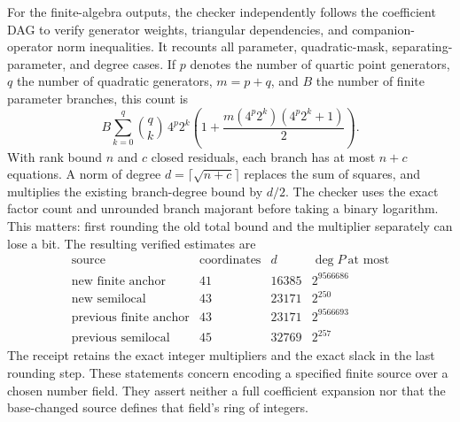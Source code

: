 For the finite-algebra outputs, the checker independently follows
the coefficient DAG to verify generator weights, triangular
dependencies, and companion-operator norm inequalities.  It
recounts all parameter, quadratic-mask, separating-parameter,
and degree cases.  If $p$ denotes the number of quartic point
generators, $q$ the number of quadratic generators, $m=p+q$,
and $B$ the number of finite parameter branches, this count is
\[
 B\sum_{k=0}^q\binom qk\,4^p2^k
        \left(1+\frac{m(4^p2^k)(4^p2^k+1)}2\right).
\]
With rank bound $n$ and $c$ closed residuals, each branch has at
most $n+c$ equations.  A norm of degree
$d=\lceil\sqrt{n+c}\rceil$ replaces the sum of squares, and
multiplies the existing branch-degree bound by $d/2$.
The checker uses the exact factor count and unrounded branch
majorant before taking a binary logarithm.  This matters: first
rounding the old total bound and the multiplier separately can
lose a bit.  The resulting verified estimates are
\[
\begin{array}{c|c|r|c}
 \text{source}&\text{coordinates}&d&\deg P\ \text{at most}\\\hline
 \text{new finite anchor}&41&16385&2^{9566686}\\
 \text{new semilocal}&43&23171&2^{250}\\
 \text{previous finite anchor}&43&23171&2^{9566693}\\
 \text{previous semilocal}&45&32769&2^{257}
\end{array}
\]
The receipt retains the exact integer multipliers and the exact
slack in the last rounding step.  These statements concern
encoding a specified finite source over a chosen number field.
They assert neither a full coefficient expansion nor that the
base-changed source defines that field's ring of integers.
